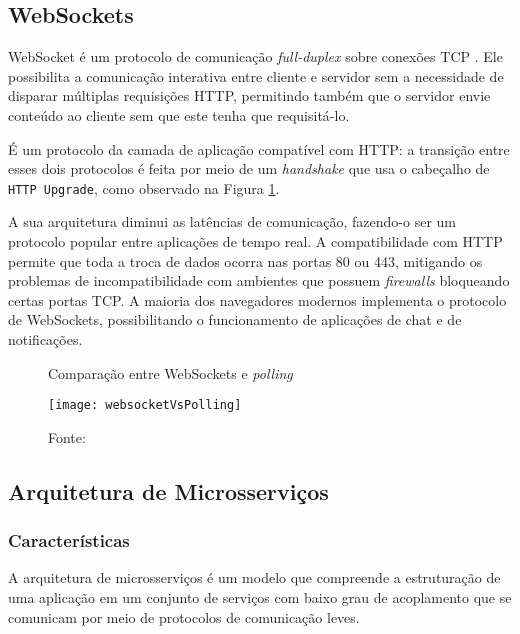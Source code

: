 \subsection{WebSockets \label{sub:websocket}}

WebSocket é um protocolo de comunicação \emph{full-duplex} sobre conexões TCP \cite{rfc6455}. Ele possibilita a comunicação interativa entre cliente e servidor sem a necessidade de disparar múltiplas requisições HTTP, permitindo também que o servidor envie conteúdo ao cliente sem que este tenha que requisitá-lo.

É um protocolo da camada de aplicação compatível com HTTP: a transição entre esses dois protocolos é feita por meio de um \textit{handshake} que usa o cabeçalho de \texttt{HTTP Upgrade}, como observado na Figura \ref{fig:websocketVsPolling}.

A sua arquitetura diminui as latências de comunicação, fazendo-o ser um protocolo popular entre aplicações de tempo real. A compatibilidade com HTTP permite que toda a troca de dados ocorra nas portas 80 ou 443, mitigando os problemas de incompatibilidade com ambientes que possuem \emph{firewalls} bloqueando certas portas TCP. A maioria dos navegadores modernos implementa o protocolo de WebSockets, possibilitando o funcionamento de aplicações de chat e de notificações.

\begin{figure}[H]
	\centering
	\caption{Comparação entre WebSockets e \emph{polling}}
  \texttt{[image: websocketVsPolling]}
	\caption*{Fonte: \cite{lubbers}}
\label{fig:websocketVsPolling}
\end{figure}

\subsection{Arquitetura de Microsserviços}

\subsubsection{Características}
A arquitetura de microsserviços é um modelo que compreende a estruturação de uma aplicação em um conjunto de serviços com baixo grau de acoplamento que se comunicam por meio de protocolos de comunicação leves.

